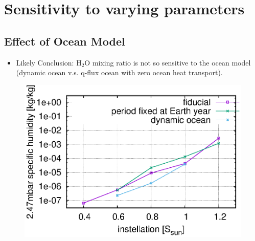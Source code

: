\documentclass[11pt,numberedappendix,twocolappendix,]{emulateapj}
\def\water{H$_2$O }
\begin{document}
\section{Sensitivity to varying parameters}
\label{s:sensitivity}

\subsection{Effect of Ocean Model}
\label{ss:sensitivity_ocean}


\begin{itemize}
\item Likely Conclusion: \water mixing ratio is not so sensitive to the ocean model (dynamic ocean v.s. q-flux ocean with zero ocean heat transport).  
\end{itemize}



\begin{figure}[!h]
    \begin{center}
    \includegraphics[width=\hsize]{fig/AqOH0TLS_GJ876_q_sensitivity_changeS0X.eps}
    \end{center}
\caption{}                                                                                                             
\label{fig:change_ocean}
\end{figure}
\end{document}
